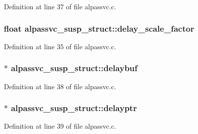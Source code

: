 Definition at line 37 of file alpassvc.\+c.

\subsubsection[{\texorpdfstring{delay\+\_\+scale\+\_\+factor}{delay_scale_factor}}]{\setlength{\rightskip}{0pt plus 5cm}float alpassvc\+\_\+susp\+\_\+struct\+::delay\+\_\+scale\+\_\+factor}\hypertarget{structalpassvc__susp__struct_aa5abb814892d4d2bf1b6bce3ed886011}{}\label{structalpassvc__susp__struct_aa5abb814892d4d2bf1b6bce3ed886011}


Definition at line 35 of file alpassvc.\+c.

\subsubsection[{\texorpdfstring{delaybuf}{delaybuf}}]{$\ast$ alpassvc\+\_\+susp\+\_\+struct\+::delaybuf}\hypertarget{structalpassvc__susp__struct_a073980ec0f775d6756f35b8bcc85b265}{}\label{structalpassvc__susp__struct_a073980ec0f775d6756f35b8bcc85b265}


Definition at line 38 of file alpassvc.\+c.

\subsubsection[{\texorpdfstring{delayptr}{delayptr}}]{$\ast$ alpassvc\+\_\+susp\+\_\+struct\+::delayptr}\hypertarget{structalpassvc__susp__struct_a98714f8a8ba703fad19257e3c1347dd0}{}\label{structalpassvc__susp__struct_a98714f8a8ba703fad19257e3c1347dd0}


Definition at line 39 of file alpassvc.\+c.

